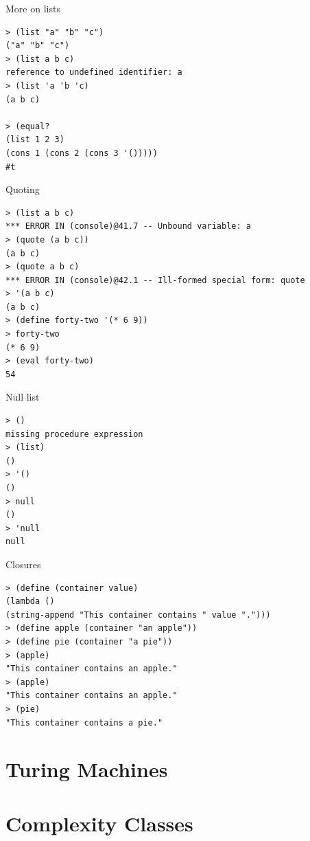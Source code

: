 \begin{frame}[fragile]{More on lists}
\begin{verbatim}
> (list "a" "b" "c")
("a" "b" "c")
> (list a b c)
reference to undefined identifier: a
> (list 'a 'b 'c)
(a b c)

> (equal? 
(list 1 2 3)
(cons 1 (cons 2 (cons 3 '()))))
#t
\end{verbatim}
\end{frame}

\begin{frame}[fragile]{Quoting}
\begin{verbatim}
> (list a b c)
*** ERROR IN (console)@41.7 -- Unbound variable: a
> (quote (a b c))
(a b c)
> (quote a b c)
*** ERROR IN (console)@42.1 -- Ill-formed special form: quote
> '(a b c) 
(a b c)
> (define forty-two '(* 6 9))
> forty-two
(* 6 9)
> (eval forty-two)
54
\end{verbatim}
\end{frame}

\begin{frame}[fragile]{Null list}
\begin{verbatim}
> ()
missing procedure expression
> (list)
()
> '()
()
> null
()
> 'null
null
\end{verbatim}
\end{frame}

\begin{frame}[fragile]{Closures}
\begin{verbatim}
> (define (container value)
(lambda ()
(string-append "This container contains " value ".")))
> (define apple (container "an apple"))
> (define pie (container "a pie"))
> (apple)
"This container contains an apple."
> (apple)
"This container contains an apple."
> (pie)
"This container contains a pie."
\end{verbatim}
\end{frame}



\section{Turing Machines}

\section{Complexity Classes}
